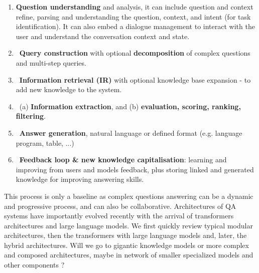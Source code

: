 \documentclass[acmsmall]{acmart}
\begin{document}
\begin{enumerate}
\item \textbf{Question understanding} and analysis, it can include question and context refine, parsing and understanding the question, context, and intent (for task identification). It can also embed a dialogue management to interact with the user and understand the conversation context and state.
\item \textbf{Query construction} with optional \textbf{decomposition} of complex questions and multi-step queries.
\item \textbf{Information retrieval (IR)} with optional knowledge base expansion - to add new knowledge to the system.
\item (a) \textbf{Information extraction}, and (b) \textbf{evaluation, scoring, ranking, filtering}.
\item \textbf{Answer generation}, natural language or defined format (e.g. language program, table, ...)
\item \textbf{Feedback loop \& new knowledge capitalisation}: learning and improving from users and models feedback, plus storing linked and generated knowledge for improving answering skills.
\end{enumerate}
This process is only a baseline as complex questions answering can be a dynamic and progressive process, and can also be collaborative.
Architectures of QA systems have importantly evolved recently with the arrival of transformers architectures and large language models. We first quickly review typical modular architectures, then the transformers with large language models and, later, the hybrid architectures. Will we go to gigantic knowledge models or more complex and composed architectures, maybe in network of smaller specialized models and other components ?
\end{document}
